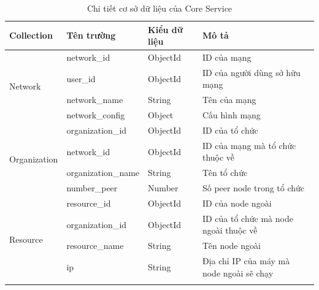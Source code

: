 \documentclass[../DoAn.tex]{subfiles}
\begin{document}
\begin{longtable}{|p{}|p{}|p{}|p{}|}
    \caption{Chi tiết cơ sở dữ liệu của Core Service}
    \label{tab:dbCoreService}                                                                                                   \\
    \hline
    Collection                                   & Tên trường         & Kiểu dữ liệu & Mô tả                                    \\ \hline
    \endhead
    \multirow[t]{4}{0.2\textwidth}{Network}      & network\_id        & ObjectId     & ID của mạng                              \\ \cline{2-4}
                                                 & user\_id           & ObjectId     & ID của người dùng sở hữu mạng            \\ \cline{2-4}
                                                 & network\_name      & String       & Tên của mạng                             \\ \cline{2-4}
                                                 & network\_config    & Object       & Cấu hình mạng                            \\ \hline
    \multirow[t]{4}{0.2\textwidth}{Organization} & organization\_id   & ObjectId     & ID của tổ chức                           \\ \cline{2-4}
                                                 & network\_id        & ObjectId     & ID của mạng mà tổ chức thuộc về          \\ \cline{2-4}
                                                 & organization\_name & String       & Tên tổ chức                              \\ \cline{2-4}
                                                 & number\_peer       & Number       & Số peer node trong tổ chức               \\ \hline
    \multirow[t]{5}{0.2\textwidth}{Resource}     & resource\_id       & ObjectId     & ID của node ngoài                        \\ \cline{2-4}
                                                 & organization\_id   & ObjectId     & ID của tổ chức mà node ngoài thuộc về    \\ \cline{2-4}
                                                 & resource\_name     & String       & Tên node ngoài                           \\ \cline{2-4}
                                                 & ip                 & String       & Địa chỉ IP của máy mà node ngoài sẽ chạy \\ \cline{2-4}

\end{longtable}
\end{document}
